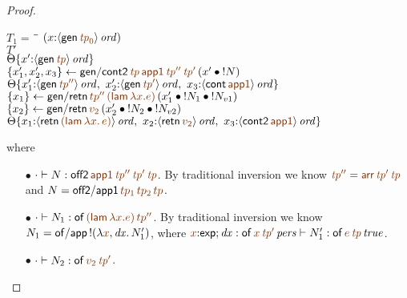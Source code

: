 \begin{proof}
\begin{description}
\begin{tabbing}
$T_1 = ~$ \= \qquad \= $(x{:}\istrue{\susp{{\sf gen}\,\lf{{\it tp}_0}}})$
\\
\>$T'$
\\
\>\>$\tackon{\Theta}{x'{:}\istrue{\susp{{\sf gen}\,\lf{{\it tp}}}}}$
\\
\>$\trstep{x_1', x_2', x_3}
     {{\sf gen/cont2}\,\lf{{\it tp}}\,\lf{\sf app1}\,
         \lf{{\it tp}''}\,\lf{{\it tp}'}\,
         (\tfuser{x'}{\tbangr{N}})}$
\\ %
\>\>$\tackon{\Theta}
     {x_1'{:}\istrue{\susp{{\sf gen}\,\lf{{\it tp}''}}}, ~
      x_2'{:}\istrue{\susp{{\sf gen}\,\lf{{\it tp}'}}}, ~
      x_3{:}\istrue{\susp{{\sf cont}\,\lf{\sf app1}}}}$
\\
\>$\trstep{x_1}
     {{\sf gen/retn}\,\lf{tp''}\,\lf{({\sf lam}\,\lambda x.e)}\,}
         (\tfuser{x_1'}{\tfuser{\tbangr{N_1}}{\tbangr{N_{v1}}}})$
\\
\>$\trstep{x_2}
     {{\sf gen/retn}\,\lf{v_2}\,(\tfuser{x_2'}{\tfuser{\tbangr{N_2}}{\tbangr{N_{v2}}}})}$
\\
\>\>$\tackon{\Theta}{x_1{:}\istrue{\susp{{\sf retn}\,\lf{({\sf lam}\,\lambda x.\,e)}}}, ~
                   x_2{:}\istrue{\susp{{\sf retn}\,\lf{v_2}}}, ~
                   x_3{:}\istrue{\susp{{\sf cont2}\,\lf{\sf app1}}}}$
\end{tabbing}
where
\begin{itemize}
\item[$\bullet$] $\cdot \vdash N : {\sf off2}\,\lf{\sf app1}\,\lf{{\it
      tp}''}\,\lf{{\it tp}'}\,\lf{{\it tp}}$.  By traditional
  inversion we know $\lf{\it{tp}''} = \lf{{\sf arr}\,{\it tp}'\,{\it
      tp}}$ and $N = {\sf off2/app1}\,\lf{tp_1}\,\lf{tp_2}\,\lf{tp}$.
\item[$\bullet$] $\cdot \vdash N_1 : {\sf of}\,\lf{({\sf lam}\,\lambda
    x.e)}\,\lf{tp''}$. By traditional inversion we know $N_1 = {\sf
    of/app}\,\tbangr{(\lambda \lf{x},{\it dx}.\,N_1')}$, where
  $\lf{x}{:}{\sf exp}; {\it dx} : \ispers{{\sf of}\,\lf{x}\,\lf{\it
      tp'}} \vdash N_1' : \isconc{{\sf of}\,\lf{e}\,\lf{\it
        tp}}$.
\item[$\bullet$] $\cdot \vdash N_2 : {\sf of}\,\lf{v_2}\,\lf{{\it tp}'}$.
\end{itemize}


\end{description}
\end{proof}
